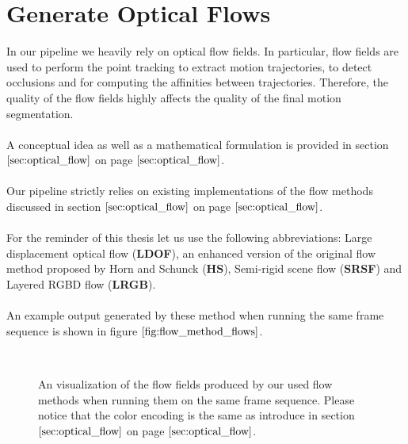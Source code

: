 \section{Generate Optical Flows}
In our pipeline we heavily rely on optical flow fields. In particular, flow fields are used to perform the point tracking to extract motion trajectories, to detect occlusions and for computing the affinities between trajectories. Therefore, the quality of the flow fields highly affects the quality of the final motion segmentation. \\ \\
A conceptual idea as well as a mathematical formulation is provided in section $\ref{sec:optical_flow}$ on page $\pageref{sec:optical_flow}$. \\ \\
Our pipeline strictly relies on existing implementations of the flow methods discussed in section $\ref{sec:optical_flow}$ on page $\pageref{sec:optical_flow}$. \\ \\
For the reminder of this thesis let us use the following abbreviations: Large displacement optical flow (\textbf{LDOF}), an enhanced version of the original flow method proposed by Horn and Schunck (\textbf{HS}), Semi-rigid scene flow (\textbf{SRSF}) and Layered RGBD flow (\textbf{LRGB}). \\ \\
An example output generated by these method when running the same frame sequence is shown in figure $\ref{fig:flow_method_flows}$.  
\begin{figure}[H]
\begin{center}
~
\end{center}
\caption[Flow Method Flows]{An visualization of the flow fields produced by our used flow methods when running them on the same frame sequence. Please notice that the color encoding is the same as introduce in section $\ref{sec:optical_flow}$ on page $\pageref{sec:optical_flow}$.}
\label{fig:flow_method_flows}
\end{figure}


